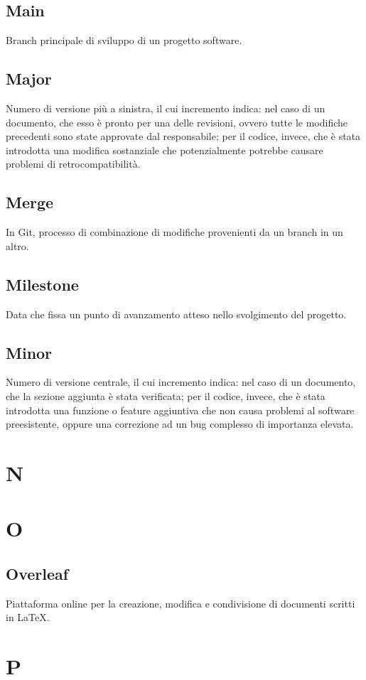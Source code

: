     \subsection{Main}
    Branch principale di sviluppo di un progetto software.
    \subsection{Major}
    Numero di versione più a sinistra, il cui incremento indica: nel caso di un documento, che esso è pronto per una delle revisioni, ovvero tutte le modifiche precedenti sono state 
    approvate dal responsabile; per il codice, invece, che è stata introdotta una modifica sostanziale che potenzialmente potrebbe causare problemi di retrocompatibilità.
    \subsection{Merge}
    In Git, processo di combinazione di modifiche provenienti da un branch in un altro.
    \subsection{Milestone}
    Data che fissa un punto di avanzamento atteso nello svolgimento del progetto.
    \subsection{Minor}
    Numero di versione centrale, il cui incremento indica: nel caso di un documento, che la sezione aggiunta è stata verificata; per il codice, invece, che è stata
    introdotta una funzione o feature aggiuntiva che non causa problemi al software preesistente, oppure una correzione ad un bug complesso di importanza elevata.
\pagebreak
\section{N}
\pagebreak
\section{O}
    \subsection{Overleaf}
    Piattaforma online per la creazione, modifica e condivisione di documenti 
    scritti in LaTeX.
\pagebreak
\section{P}
